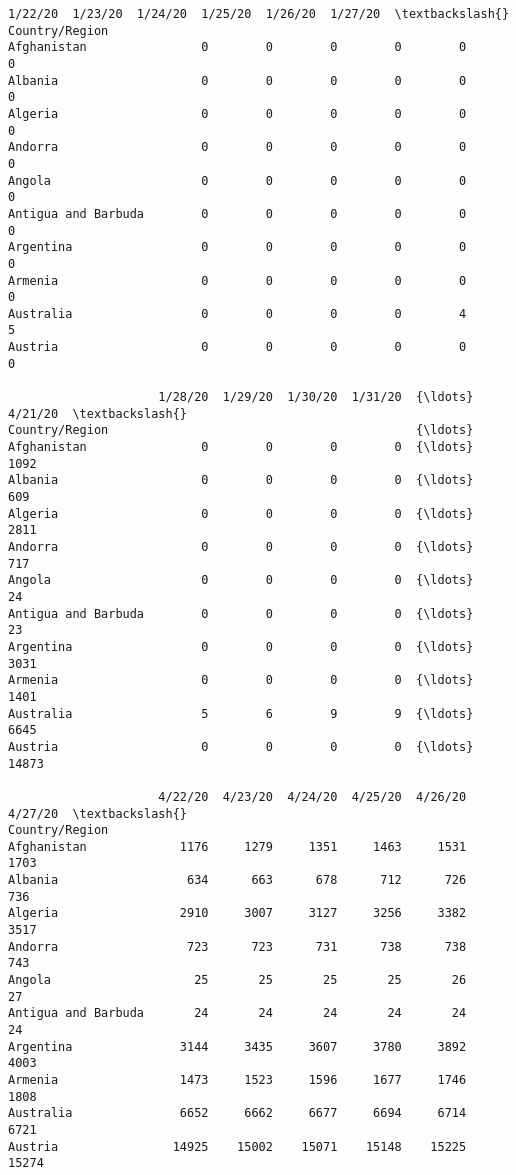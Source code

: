 \documentclass[11pt]{article}
\newcommand{\prompt}[4]{
        \llap{{\color{#2}[#3]: #4}}\vspace{-1.25em}
    }
\begin{document}
            \begin{tcolorbox}[breakable, boxrule=.5pt, size=fbox, pad at break*=1mm, opacityfill=0]
\prompt{Out}{outcolor}{9}{\hspace{3.5pt}}
\begin{Verbatim}[commandchars=\\\{\}]
                     1/22/20  1/23/20  1/24/20  1/25/20  1/26/20  1/27/20  \textbackslash{}
Country/Region
Afghanistan                0        0        0        0        0        0
Albania                    0        0        0        0        0        0
Algeria                    0        0        0        0        0        0
Andorra                    0        0        0        0        0        0
Angola                     0        0        0        0        0        0
Antigua and Barbuda        0        0        0        0        0        0
Argentina                  0        0        0        0        0        0
Armenia                    0        0        0        0        0        0
Australia                  0        0        0        0        4        5
Austria                    0        0        0        0        0        0

                     1/28/20  1/29/20  1/30/20  1/31/20  {\ldots}  4/21/20  \textbackslash{}
Country/Region                                           {\ldots}
Afghanistan                0        0        0        0  {\ldots}     1092
Albania                    0        0        0        0  {\ldots}      609
Algeria                    0        0        0        0  {\ldots}     2811
Andorra                    0        0        0        0  {\ldots}      717
Angola                     0        0        0        0  {\ldots}       24
Antigua and Barbuda        0        0        0        0  {\ldots}       23
Argentina                  0        0        0        0  {\ldots}     3031
Armenia                    0        0        0        0  {\ldots}     1401
Australia                  5        6        9        9  {\ldots}     6645
Austria                    0        0        0        0  {\ldots}    14873

                     4/22/20  4/23/20  4/24/20  4/25/20  4/26/20  4/27/20  \textbackslash{}
Country/Region
Afghanistan             1176     1279     1351     1463     1531     1703
Albania                  634      663      678      712      726      736
Algeria                 2910     3007     3127     3256     3382     3517
Andorra                  723      723      731      738      738      743
Angola                    25       25       25       25       26       27
Antigua and Barbuda       24       24       24       24       24       24
Argentina               3144     3435     3607     3780     3892     4003
Armenia                 1473     1523     1596     1677     1746     1808
Australia               6652     6662     6677     6694     6714     6721
Austria                14925    15002    15071    15148    15225    15274


\end{Verbatim}
\end{tcolorbox}
\end{document}
